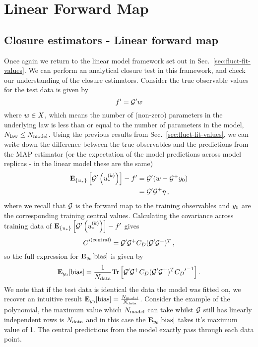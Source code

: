 \section{Linear Forward Map}

\subsection{Closure estimators - Linear forward map}
\label{Sec:LinearMapEstimators}

Once again we return to the linear model framework set out in
Sec.~\ref{sec:fluct-fit-values}. We can perform an analytical closure
test in this framework, and check our
understanding of the closure estimators. Consider the true observable
values for the test data is given by
\begin{equation}\label{eq:LinearLawMap}
    {{f}^{\prime}} = {{\mathcal{G}}^{\prime}} w
\end{equation}
where $w \in X$, which means the number of (non-zero) parameters
in the underlying law is less than or equal to the number of parameters in the
model, $N_{\rm law} \leq N_{\rm model}$. Using the previous results from
Sec.~\ref{sec:fluct-fit-values}, we can write down the
difference between the true observables and the predictions from the MAP estimator
(or the expectation of the model predictions across model replicas - in the
linear model these are the same)
\begin{equation}
    \begin{split}
        \mathbf{E}_{\{ u_* \}} \left[ {{\mathcal{G}}^{\prime}}\left(u_*^{(k)}\right) \right] - {{f}^{\prime}} &=
        {{\mathcal{G}}^{\prime}} (w - \mathcal{G}^+ y_0 ) \\
        &= {{\mathcal{G}}^{\prime}} \mathcal{G}^+ \eta \, ,
    \end{split}
\end{equation}
where we recall that $\mathcal{G}$ is the forward map to the training observables
and $y_0$ are
the corresponding training central values. Calculating the covariance across
training data of
$\mathbf{E}_{\{ u_* \}} \left[ {{\mathcal{G}}^{\prime}}\left(u_*^{(k)}\right) \right] - {{f}^{\prime}}$
gives
\begin{equation}
    {{C}^{\prime}}^{(\rm central)} = {{\mathcal{G}}^{\prime}} \mathcal{G}^+ C_{D} ({{\mathcal{G}}^{\prime}} \mathcal{G}^+)^T \, ,
\end{equation}
so the full expression for $\mathbf{E}_{y_0}[{\rm bias}]$ is given by
\begin{equation}\label{eq:BiasLinearModel}
    \mathbf{E}_{y_0}[{\rm bias}] = \frac{1}{N_{\rm data}}
    {\rm Tr} \left[
        {{\mathcal{G}}^{\prime}} \mathcal{G}^+ C_{D} ({{\mathcal{G}}^{\prime}} \mathcal{G}^+)^T
        {{C_{D}}^{\prime}}^{-1}
    \right].
\end{equation}
We note that if the test data is identical the data the model was fitted on,
we recover an intuitive result $\mathbf{E}_{y_0}[{\rm bias}] = \frac{N_{\rm model}}{N_{\rm data}}$.
Consider the example of the polynomial, the maximum value which $N_{\rm model}$ can
take whilst $\mathcal{G}$ still has linearly independent rows is $N_{\rm data}$ and in this case
the $\mathbf{E}_{y_0}[{\rm bias}]$ takes it's maximum value of 1. The central
predictions from the model exactly pass through each data point.

